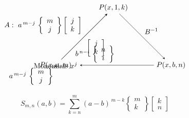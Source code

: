 \documentclass{article}
\begin{document}
\[
\begin{tikzpicture}[>=stealth, node distance=4cm, auto]
  \node (Pa) {$P(x,a,m)$};
  \node (P1) [above right of=Pa] {$P(x,1,k)$};
  \node (Pb) [below right of=P1] {$P(x,b,n)$};
  \node (Mono) [below left of=P1] {Monomials $x^j$};

  \draw[->] (Pa) -- node[above left] {$A:\ a^{\,m-j}\,\left\{\begin{array}{c} m \\ j \end{array}\right\} \left[\begin{array}{c} j \\ k \end{array}\right]$} (P1);
  \draw[->] (P1) -- node[above right] {$B^{-1}$} (Pb);
  \draw[->] (Pa) -- node[below left] {$a^{\,m-j}\,\left\{\begin{array}{c} m \\ j \end{array}\right\}$} (Mono);
  \draw[->] (Mono) -- node[below right] {$\left[\begin{array}{c} j \\ k \end{array}\right]$} (P1);
  \draw[->] (Pb) -- node[above left] {$b^{\,n-i}\,\left\{\begin{array}{c} n \\ i \end{array}\right\}$} (Mono);
\end{tikzpicture}
\]

\[
S_{m,n}(a,b) = \sum_{k=n}^m (a-b)^{\,m-k}
\left\{\begin{array}{c}m\\k\end{array}\right\}
\left[\begin{array}{c}k\\n\end{array}\right]
\]
\end{document}
